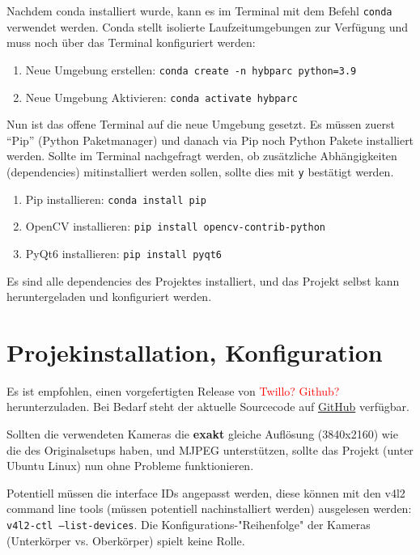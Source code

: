 \documentclass[a4paper]{article}
\newcommand{\warn}[1]{\textcolor{red}{#1}}
\newcommand{\code}[1]{\texttt{#1}}
\begin{document}
Nachdem conda installiert wurde, kann es im Terminal mit dem Befehl \code{conda} verwendet werden. Conda stellt isolierte Laufzeitumgebungen zur Verfügung und muss noch über das Terminal konfiguriert werden:
\begin{enumerate}
    \item Neue Umgebung erstellen: \code{conda create -n hybparc python=3.9}
    \item Neue Umgebung Aktivieren: \code{conda activate hybparc}
\end{enumerate}

Nun ist das offene Terminal auf die neue Umgebung gesetzt. Es müssen zuerst \enquote{Pip} (Python Paketmanager) und danach via Pip noch Python Pakete installiert werden. Sollte im Terminal nachgefragt werden, ob zusätzliche Abhängigkeiten (dependencies) mitinstalliert werden sollen, sollte dies mit \code{y} bestätigt werden.

\begin{enumerate}
    \item Pip installieren: \code{conda install pip}
    \item OpenCV installieren: \code{pip install opencv-contrib-python}
    \item PyQt6 installieren: \code{pip install pyqt6}
\end{enumerate}

Es sind alle dependencies des Projektes installiert, und das Projekt selbst kann heruntergeladen und konfiguriert werden.


\section{Projekinstallation, Konfiguration}
Es ist empfohlen, einen vorgefertigten Release von \warn{Twillo? Github?} herunterzuladen. Bei Bedarf steht der aktuelle Sourcecode auf \href{https://github.com/leloomi/hybparc_aruco}{GitHub} verfügbar.

Sollten die verwendeten Kameras die \textbf{exakt} gleiche Auflösung (3840x2160) wie die des Originalsetups haben, und MJPEG unterstützen, sollte das Projekt (unter Ubuntu Linux) nun ohne Probleme funktionieren. 

Potentiell müssen die interface IDs angepasst werden, diese können mit den v4l2 command line tools (müssen potentiell nachinstalliert werden) ausgelesen werden: \code{v4l2-ctl --list-devices}. Die Konfigurations-"Reihenfolge" der Kameras (Unterkörper vs. Oberkörper) spielt keine Rolle.
\end{document}
